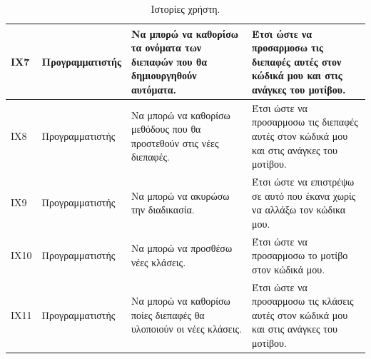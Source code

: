 \begin{table}[H]
\begin{tabular}{|p{1.5cm}|p{3.5cm}|p{4.5cm}|p{4.7cm}|}
        ΙΧ7 & Προγραμματιστής & Να μπορώ να καθορίσω τα ονόματα των διεπαφών που θα δημιουργηθούν αυτόματα. & Έτσι ώστε να προσαρμοσω τις διεπαφές αυτές στον κώδικά μου και στις ανάγκες του μοτίβου. \\ \hline
        ΙΧ8 & Προγραμματιστής & Να μπορώ να καθορίσω μεθόδους που θα προστεθούν στις νέες διεπαφές. & Έτσι ώστε να προσαρμοσω τις διεπαφές αυτές στον κώδικά μου και στις ανάγκες του μοτίβου. \\ \hline
        ΙΧ9 & Προγραμματιστής & Να μπορώ να ακυρώσω την διαδικασία. & Έτσι ώστε να επιστρέψω σε αυτό που έκανα χωρίς να αλλάξω τον κώδικα μου. \\ \hline
		ΙΧ10 & Προγραμματιστής & Να μπορώ να προσθέσω νέες κλάσεις. & Έτσι ώστε να προσαρμοσω το μοτίβο στον κώδικά μου. \\ \hline
		ΙΧ11 & Προγραμματιστής & Να μπορώ να καθορίσω ποίες διεπαφές θα υλοποιούν οι νέες κλάσεις. & Έτσι ώστε να προσαρμοσω τις κλάσεις αυτές στον κώδικά μου και στις ανάγκες του μοτίβου. \\ \hline
    \end{tabular}
	\caption{Ιστορίες χρήστη.}
    \label{tab:userStories}
\end{table}
